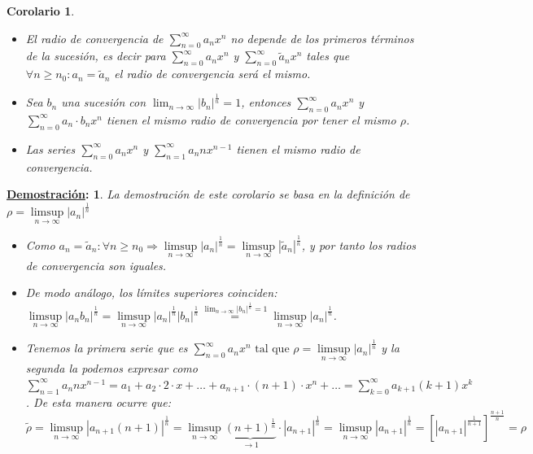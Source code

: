 \documentclass[10pt,a4paper,openright]{book}
\theoremstyle{break}
\newtheorem*{coro}{Corolario}
\newtheorem*{demo}{\underline{Demostración}:}
\begin{document}
\begin{coro}
\begin{itemize}
\item El radio de convergencia de $\sum_{n=0}^{\infty} a_n x^n$ no depende de los primeros términos de la sucesión, es decir para $\sum_{n=0}^{\infty} a_n x^n$  y $\sum_{n=0}^{\infty} \tilde{a}_n x^n$ tales que $\forall n \geq n_0 : a_n = \tilde{a}_n $ el radio de convergencia será el mismo.

\item Sea $b_n$ una sucesión con $\lim_{n \to \infty} |b_n|^\frac{1}{n} = 1$, entonces $\sum_{n=0}^{\infty} a_n x^n$ y $\sum_{n=0}^{\infty} a_n \cdot b_n x^n$ tienen el mismo radio de convergencia por tener el mismo $\rho$.

\item Las series $\sum_{n=0}^{\infty} a_n x^n$ y $\sum_{n=1}^{\infty} a_n n x^{n-1}$ tienen el mismo radio de convergencia.
\end{itemize}
\end{coro}
\begin{demo}
La demostración de este corolario se basa en la definición de $\rho = \underset{n \to \infty}\limsup |a_n|^{\frac{1}{n}}$
\begin{itemize}
\item Como $a_n = \tilde{a}_n : \forall n \geq n_0 \Rightarrow \underset{n \to \infty}\limsup |a_n|^{\frac{1}{n}} = \underset{n \to \infty}\limsup |\tilde{a}_n|^{\frac{1}{n}}$, y por tanto los radios de convergencia son iguales.

\item De modo análogo, los límites superiores coinciden: $\underset{n \to \infty}\limsup |a_n b_n|^{\frac{1}{n}} = \underset{n \to \infty}\limsup |a_n|^{\frac{1}{n}} |b_n|^{\frac{1}{n}} \overset{\lim_{n \to \infty} |b_n|^\frac{1}{n} = 1}{=} \underset{n \to \infty}\limsup |a_n|^{\frac{1}{n}}$.

\item Tenemos la primera serie que es $\sum_{n=0}^{\infty} a_n x^n \mbox{ tal que } \rho = \underset{n \to \infty}\limsup |a_n|^{\frac{1}{n}}$ y la segunda la podemos expresar como $\sum_{n=1}^{\infty} a_n n x^{n-1} = a_1 + a_2 \cdot 2 \cdot x + \ldots + a_{n+1} \cdot (n+1) \cdot x^n + \ldots = \sum_{k=0}^{\infty} a_{k+1}(k+1) x^k$. De esta manera ocurre que:
$$\tilde{\rho} = \underset{n \to \infty}\limsup |a_{n+1} (n+1)|^\frac{1}{n} = \underset{n \to \infty}\limsup \underbrace{(n+1)^\frac{1}{n}}_{\to 1} \cdot |a_{n+1}|^\frac{1}{n} = \underset{n \to \infty}\limsup |a_{n+1}|^\frac{1}{n} = [|a_{n+1}|^\frac{1}{n+1}]^\frac{n+1}{n} = \rho$$
\end{itemize}
\end{demo}
\end{document}
